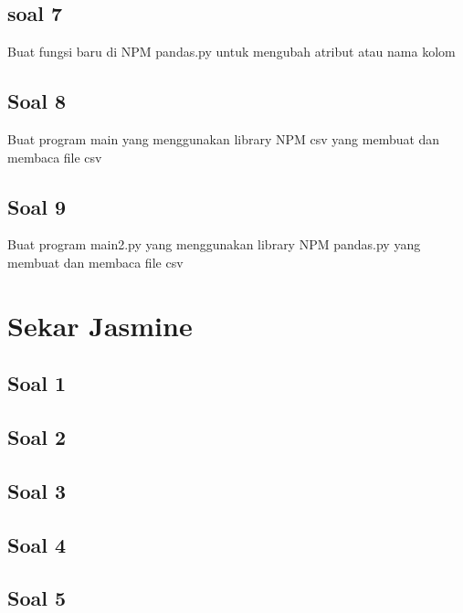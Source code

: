 \subsection{soal 7}
Buat fungsi baru di NPM pandas.py untuk mengubah atribut atau nama kolom


\subsection{Soal 8}
Buat program main yang menggunakan library NPM csv yang membuat dan membaca file csv


\subsection{Soal 9}
Buat program main2.py yang menggunakan library NPM pandas.py yang membuat dan membaca file csv





\section{Sekar Jasmine}
\subsection{Soal 1}

\subsection{Soal 2}

\subsection{Soal 3}

\subsection{Soal 4}

\subsection{Soal 5}

